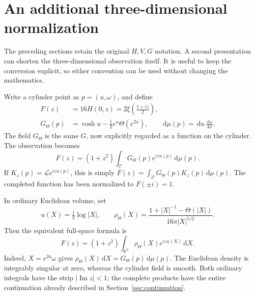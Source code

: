 \documentclass[11pt]{article}
\theoremstyle{remark}
\numberwithin{equation}{section}
\newcommand{\R}{\mathbb R}
\newcommand{\cC}{\mathcal C}
\newcommand{\cL}{\mathcal L}
\newcommand{\dd}{\,\mathrm d}
\begin{document}
\section{An additional three-dimensional normalization}
\label{sec:alternative}

The preceding sections retain the original \(H,V,G\) notation. A
second presentation can shorten the three-dimensional observation itself.
It is useful to keep the conversion explicit, so either convention can
be used without changing the mathematics.

Write a cylinder point as \(p=(u,\omega)\), and define
\begin{equation}\label{eq:alternative-defs}
 \begin{aligned}
 F(z)&=16H(0,z)=2\xi\!\left(\frac{1+iz}{2}\right),\\
 G_\Theta(p)&=\cosh u-\tfrac12e^u\Theta(e^{2u}),\qquad
 \dd\mu(p)=\dd u\,\frac{\dd\omega}{4\pi}.
 \end{aligned}
\end{equation}
The field \(G_\Theta\) is the same \(G\), now explicitly regarded
as a function on the cylinder. The observation becomes
\begin{equation}\label{eq:alternative-cylinder}
 \boxed{\displaystyle
 F(z)=(1+z^2)\int_{\cC}G_\Theta(p)e^{izu(p)}\dd\mu(p).}
\end{equation}
If \(K_z(p)=\cL e^{izu(p)}\), this is simply
\(F(z)=\int_{\cC}G_\Theta(p)K_z(p)\dd\mu(p)\).
The completed function has been normalized to \(F(\pm i)=1\).

In ordinary Euclidean volume, set
\begin{equation}\label{eq:alternative-density}
 u(X)=\tfrac12\log|X|,\qquad
 \rho_\Theta(X)=\frac{1+|X|^{-1}-\Theta(|X|)}{16\pi|X|^{5/2}}.
\end{equation}
Then the equivalent full-space formula is
\begin{equation}\label{eq:alternative-euclidean}
 \boxed{\displaystyle
 F(z)=(1+z^2)\int_{\R^3}\rho_\Theta(X)e^{izu(X)}\dd X.}
\end{equation}
Indeed, \(X=e^{2u}\omega\) gives
\(\rho_\Theta(X)\dd X=G_\Theta(p)\dd\mu(p)\).
The Euclidean density is integrably singular at zero, whereas the
cylinder field is smooth. Both ordinary integrals have the strip
\(|\operatorname{Im}z|<1\); the complete products have the entire
continuation already described in Section~\ref{sec:continuation}.
\end{document}
